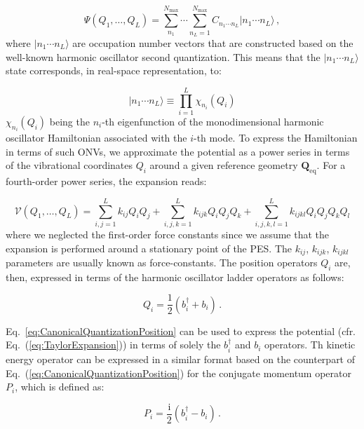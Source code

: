 \documentclass[bibliography=totoc,12pt,a4paper]{scrartcl}
\begin{document}
\begin{equation}
  \Psi(Q_1, \ldots, Q_L) = \sum_{n_1}^{N_\text{max}} \cdots \sum_{n_L=1}^{N_\text{max}}
	C_{n_1 \cdots n_L} | n_1 \cdots n_L \rangle \, ,
  \label{eq:CanonicalQuantizationCI}
\end{equation}
%
where $| n_1 \cdots n_L \rangle$ are occupation number vectors that are constructed based on the well-known harmonic oscillator second quantization.
This means that the $| n_1 \cdots n_L \rangle$ state corresponds, in real-space representation, to:

\begin{equation}
  | n_1 \cdots n_L \rangle \equiv \prod_{i=1}^L \chi_{n_i}(Q_i)
  \label{eq:HarmonicOscillatorBasis}
\end{equation}
%
$\chi_{n_i}(Q_i)$ being the $n_i$-th eigenfunction of the monodimensional harmonic oscillator Hamiltonian associated with the $i$-th mode.
To express the Hamiltonian in terms of such ONVs, we approximate the potential as a power series in terms of the vibrational coordinates $Q_i$ around a given reference geometry $\bm{Q}_\text{eq}$.
For a fourth-order power series, the expansion reads:

\begin{equation}
  \mathcal{V}(Q_1, \ldots, Q_L) 
	= \sum_{i,j=1}^L k_{ij} Q_i Q_j + \sum_{i,j,k=1}^L k_{ijk} Q_i Q_j Q_k
    + \sum_{i,j,k,l=1}^L k_{ijkl} Q_i Q_j Q_k Q_l
  \label{eq:TaylorExpansion}
\end{equation}
%
where we neglected the first-order force constants since we assume that the expansion is performed around a stationary point of the PES.
The $k_{ij}$, $k_{ijk}$, $k_{ijkl}$ parameters are usually known as force-constants.
The position operators $Q_i$ are, then, expressed in terms of the harmonic oscillator ladder operators as follows:

\begin{equation}
  Q_i = \frac{1}{2} \left( b_i^\dagger + b_i \right) \, .
  \label{eq:CanonicalQuantizationPosition}
\end{equation}

Eq.~\ref{eq:CanonicalQuantizationPosition} can be used to express the potential (cfr. Eq.~(\ref{eq:TaylorExpansion})) in terms of solely the $b_i^\dagger$ and $b_i$ operators.
Th kinetic energy operator can be expressed in a similar format based on the counterpart of Eq.~(\ref{eq:CanonicalQuantizationPosition}) for the conjugate momentum operator $P_i$, which is defined as:

\begin{equation}
  P_i = \frac{\mathrm{i}}{2} \left( b_i^\dagger - b_i \right) \, .
  \label{eq:CanonicalQuantizationMomentum}
\end{equation}
\end{document}
